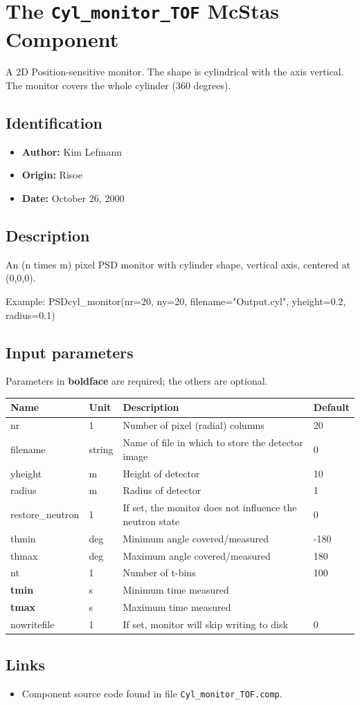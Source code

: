 \section{The \texttt{Cyl\_monitor\_TOF} McStas Component}
A 2D Position-sensitive monitor. The shape is cylindrical with
the axis vertical. The monitor covers the whole cylinder (360 degrees).

\subsection*{Identification}
\begin{itemize}
  \item \textbf{Author:} Kim Lefmann
  \item \textbf{Origin:} Risoe
  \item \textbf{Date:} October 26, 2000
\end{itemize}

\subsection*{Description}
An (n times m) pixel PSD monitor with cylinder shape, vertical axis, centered at (0,0,0).

Example: PSDcyl\_monitor(nr=20, ny=20, filename="Output.cyl", yheight=0.2, radius=0.1)

\subsection*{Input parameters}
Parameters in \textbf{boldface} are required; the others are optional.

\begin{longtable}{p{}p{}p{}p{}}
\toprule
\textbf{Name} & \textbf{Unit} & \textbf{Description} & \textbf{Default} \\
\midrule
\endhead
nr & 1 & Number of pixel (radial) columns & 20 \\
filename & string & Name of file in which to store the detector image & 0 \\
yheight & m & Height of detector & 10 \\
radius & m & Radius of detector & 1 \\
restore\_neutron & 1 & If set, the monitor does not influence the neutron state & 0 \\
thmin & deg & Minimum angle covered/measured & -180 \\
thmax & deg & Maximum angle covered/measured & 180 \\
nt & 1 & Number of t-bins & 100 \\
\textbf{tmin} & s & Minimum time measured &  \\
\textbf{tmax} & s & Maximum time measured &  \\
nowritefile & 1 & If set, monitor will skip writing to disk & 0 \\
\bottomrule
\end{longtable}

\subsection*{Links}
\begin{itemize}
  \item Component source code found in file \texttt{Cyl\_monitor\_TOF.comp}.
\end{itemize}

